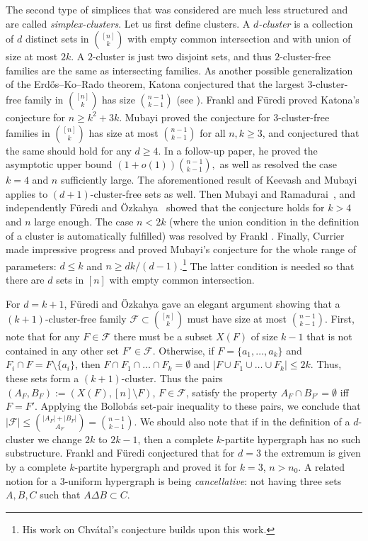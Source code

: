 \documentclass[graybox]{svmult}
\renewcommand{\le}{\leqslant}
\renewcommand{\ge}{\geqslant}
\newcommand{\ff}{\mathcal{F}}
\begin{document}
The second type of simplices that was considered are much less structured and are called {\it simplex-clusters}. Let us first define clusters. A {\it $d$-cluster} is a collection of $d$ distinct sets in ${[n]\choose k}$ with empty common intersection and with union of size at most $2k$. A $2$-cluster is just two disjoint sets, and thus $2$-cluster-free families are the same as intersecting families. As another possible generalization of the Erd\H os--Ko--Rado theorem, Katona conjectured that the largest $3$-cluster-free family in ${[n]\choose k}$ has size ${n-1\choose k-1}$ (see \cite{FF0}). Frankl and F\"uredi \cite{FF0} proved Katona's conjecture for $n\ge k^2+3k$.
Mubayi \cite{Mu} proved the conjecture for  $3$-cluster-free families in ${[n]\choose k}$ has size at most ${n-1\choose k-1}$ for all $n,k\ge 3$, and conjectured that the same should hold for any $d\ge 4$. In a follow-up paper, he proved the asymptotic upper bound $(1+o(1)){n-1\choose k-1},$ as well as resolved the case $k=4$ and $n$ sufficiently large. The aforementioned result of Keevash and Mubayi \cite{KM} applies to $(d+1)$-cluster-free sets as well. Then Mubayi and Ramadurai~\cite{MR}, and independently F\"uredi and \"Ozkahya~\cite{FO} showed that the conjecture holds for $k>4$ and $n$ large enough. The case $n<2k$ (where the union condition in the definition of a cluster is automatically fulfilled) was resolved by Frankl \cite{Fra76}. Finally, Currier \cite{Curr1} made impressive progress and proved Mubayi's conjecture for the whole range of parameters: $d\le k$ and $n\ge dk/(d-1)$.\footnote{His work on Chv\'atal's conjecture builds upon this work.} The latter condition is needed so that there are $d$ sets in $[n]$ with empty common intersection.

For $d= k+1$, F\"uredi and \"Ozkahya \cite{FO} gave an elegant argument showing that a $(k+1)$-cluster-free family $\ff\subset{[n]\choose k}$ must have size at most ${n-1\choose k-1}$. First, note that for any $F\in \ff$ there must be a subset $X(F)$ of size $k-1$ that is not contained in any other set $F'\in \ff$. Otherwise, if $F = \{a_1,\ldots, a_k\}$ and $F_i\cap F = F\setminus \{a_i\}$, then $F\cap F_1\cap\ldots\cap F_k = \emptyset$ and $|F\cup F_1\cup \ldots\cup F_k|\le 2k$. Thus, these sets form a $(k+1)$-cluster. Thus the pairs  $(A_F,B_F):=(X(F),[n]\setminus F)$, $F\in \ff$, satisfy the property $A_F\cap B_{F'} = \emptyset$ iff $F = F'$. Applying the Bollob\'as set-pair inequality \cite{Bol} to these pairs, we conclude that $|\ff|\le {|A_F|+|B_F|\choose A_F} = {n-1\choose k-1}$.  We should also note that if in the definition of a $d$-cluster we change $2k$ to $2k-1$, then a complete $k$-partite hypergraph has no such substructure. Frankl and F\"uredi \cite{FF0} conjectured that for $d=3$ the extremum is given by a complete $k$-partite hypergraph and proved it for $k=3$, $n>n_0$. A related notion for a $3$-uniform hypergraph is being {\it cancellative}: not having three sets $A,B,C$ such that $A\Delta B\subset C$.
\end{document}
